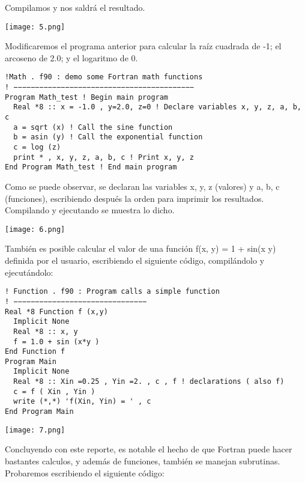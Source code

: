 \documentclass[12pt]{article}
\begin{document}
Compilamos y nos saldrá el resultado.

\begin{center}
\texttt{[image: 5.png]}\\
\end{center}

Modificaremos el programa anterior para calcular la raíz cuadrada de -1; el arcoseno de 2.0; y el logaritmo de 0.

\begin{verbatim}
!Math . f90 : demo some Fortran math functions
! −−−−−−−−−−−−−−−−−−−−−−−−−−−−−−−−−−−−−−−−−−
Program Math_test ! Begin main program
  Real *8 :: x = -1.0 , y=2.0, z=0 ! Declare variables x, y, z, a, b, c
  a = sqrt (x) ! Call the sine function
  b = asin (y) ! Call the exponential function
  c = log (z)
  print * , x, y, z, a, b, c ! Print x, y, z
End Program Math_test ! End main program 
\end{verbatim}

Como se puede observar, se declaran las variables x, y, z (valores) y a, b, c (funciones), escribiendo después la orden para imprimir los resultados. Compilando y ejecutando se muestra lo dicho.

\begin{center}
\texttt{[image: 6.png]}\\
\end{center}

También es posible calcular el valor de una función f(x, y) = 1 + sin(x y) definida por el usuario, escribiendo el siguiente código, compilándolo y ejecutándolo:

\begin{verbatim}
! Function . f90 : Program calls a simple function
! −−−−−−−−−−−−−−−−−−−−−−−−−−−−−−−
Real *8 Function f (x,y)
  Implicit None
  Real *8 :: x, y
  f = 1.0 + sin (x*y )
End Function f
Program Main
  Implicit None
  Real *8 :: Xin =0.25 , Yin =2. , c , f ! declarations ( also f)
  c = f ( Xin , Yin )
  write (*,*) 'f(Xin, Yin) = ' , c
End Program Main 
\end{verbatim}

\begin{center}
\texttt{[image: 7.png]}\\
\end{center}

Concluyendo con este reporte, es notable el hecho de que Fortran puede hacer bastantes calculos, y además de funciones, también se manejan subrutinas. Probaremos escribiendo el siguiente código:
\end{document}
